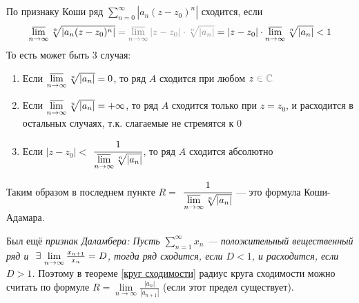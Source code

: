 \begin{prf}\\
	\\
	По признаку Коши ряд $\sum\limits_{n = 0}^{\infty} |a_n(z - z_0)^n|$ сходится, если 
	\[\varlimsup\limits_{n \to \infty} \sqrt[n]{|a_n(z - z_0)^n|} \uns{{} = \varlimsup\limits_{n \to \infty} |z - z_0| \cdot \sqrt[n]{|a_n|}} = |z - z_0| \cdot \varlimsup\limits_{n \to \infty} \sqrt[n]{|a_n|} < 1\] То есть может быть 3 случая:
	\begin{enumerate}
		\item Если $\varlimsup\limits_{n \to \infty} \sqrt[n]{|a_n|} = 0$, то ряд $A$ сходится при любом $z \uns{{} \in \cc}$ 
		
		\item Если $\varlimsup\limits_{n \to \infty} \sqrt[n]{|a_n|} = +\infty$, то ряд $A$ сходится только при $z = z_0$, и расходится в остальных случаях, т.к. слагаемые не стремятся к 0
		
		\item Если $|z - z_0| <{}$ {\small$\cfrac{1}{\varlimsup\limits_{n \to \infty} \sqrt[n]{|a_n|}}$}, то ряд $A$ сходится абсолютно
	\end{enumerate}
	\hspace{20pt}Таким образом  в последнем пункте $R ={}$ {\small$\cfrac{1}{\varlimsup\limits_{n \to \infty} \sqrt[n]{|a_n|}}$} --- это формула Коши-Адамара.
\end{prf}

\begin{zam}[https://youtu.be/zgKkH3Nr6-4?si=DDcTOSeonrxbvb41&t=3079]
	Был ещё \textit{признак Даламбера: Пусть $\sum\limits_{n = 1}^{\infty} x_n$ --- положительный вещественный ряд и$\E \lim\limits_{n \to \infty}\frac{x_{n + 1}}{x_n} = D$, тогда ряд сходится, если $D < 1$, и расходится, если $D > 1$.} Поэтому в теореме \ref{круг сходимости} радиус круга сходимости можно считать по формуле $R = \lim\limits_{n \to \infty}\frac{|a_n|}{|a_{n + 1}|}$ (если этот предел существует).
\end{zam}

